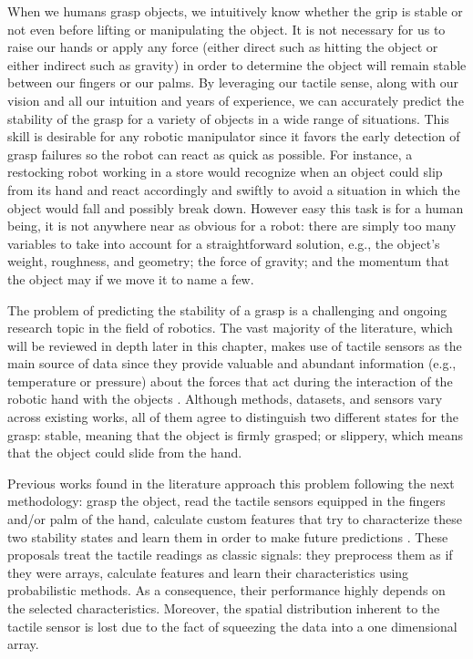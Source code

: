 When we humans grasp objects, we intuitively know whether the grip is stable or not even before lifting or manipulating the object. It is not necessary for us to raise our hands or apply any force (either direct such as hitting the object or either indirect such as gravity) in order to determine the object will remain stable between our fingers or our palms. By leveraging our tactile sense, along with our vision and all our intuition and years of experience, we can accurately predict the stability of the grasp for a variety of objects in a wide range of situations. This skill is desirable for any robotic manipulator since it favors the early detection of grasp failures so the robot can react as quick as possible. For instance, a restocking robot working in a store would recognize when an object could slip from its hand and react accordingly and swiftly to avoid a situation in which the object would fall and possibly break down. However easy this task is for a human being, it is not anywhere near as obvious for a robot: there are simply too many variables to take into account for a straightforward solution, e.g., the object's weight, roughness, and geometry; the force of gravity; and the momentum that the object may if we move it to name a few.

The problem of predicting the stability of a grasp is a challenging and ongoing research topic in the field of robotics. The vast majority of the literature, which will be reviewed in depth later in this chapter, makes use of tactile sensors as the main source of data since they provide valuable and abundant information (e.g., temperature or pressure) about the forces that act during the interaction of the robotic hand with the objects \cite{Kappassov2015}. Although methods, datasets, and sensors vary across existing works, all of them agree to distinguish two different states for the grasp: stable, meaning that the object is firmly grasped; or slippery, which means that the object could slide from the hand.

Previous works found in the literature approach this problem following the next methodology: grasp the object, read the tactile sensors equipped in the fingers and/or palm of the hand, calculate custom features that try to characterize these two stability states and learn them in order to make future predictions \cite{Li2014b,Dang2014,Su2015b,Veiga2015}. These proposals treat the tactile readings as classic signals: they preprocess them as if they were arrays, calculate features and learn their characteristics using probabilistic methods. As a consequence, their performance highly depends on the selected characteristics. Moreover, the spatial distribution inherent to the tactile sensor is lost due to the fact of squeezing the data into a one dimensional array.

